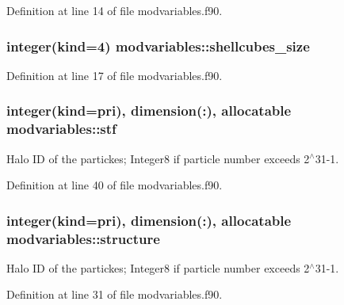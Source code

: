 Definition at line 14 of file modvariables.\+f90.

\subsubsection[{\texorpdfstring{shellcubes\+\_\+size}{shellcubes_size}}]{\setlength{\rightskip}{0pt plus 5cm}integer(kind=4) modvariables\+::shellcubes\+\_\+size}\hypertarget{namespacemodvariables_a9b7ba2cda6114449e99e9f7f348d4c32}{}\label{namespacemodvariables_a9b7ba2cda6114449e99e9f7f348d4c32}


Definition at line 17 of file modvariables.\+f90.

\subsubsection[{\texorpdfstring{stf}{stf}}]{\setlength{\rightskip}{0pt plus 5cm}integer(kind={\bf pri}), dimension(\+:), allocatable modvariables\+::stf}\hypertarget{namespacemodvariables_a5b99e0cc82073c06969e0fe6caa06357}{}\label{namespacemodvariables_a5b99e0cc82073c06969e0fe6caa06357}


Halo ID of the partickes; Integer8 if particle number exceeds 2$^\wedge$31-\/1. 



Definition at line 40 of file modvariables.\+f90.

\subsubsection[{\texorpdfstring{structure}{structure}}]{\setlength{\rightskip}{0pt plus 5cm}integer(kind={\bf pri}), dimension(\+:), allocatable modvariables\+::structure}\hypertarget{namespacemodvariables_a93c25eb46b5370bd8153733e03f3008d}{}\label{namespacemodvariables_a93c25eb46b5370bd8153733e03f3008d}


Halo ID of the partickes; Integer8 if particle number exceeds 2$^\wedge$31-\/1. 



Definition at line 31 of file modvariables.\+f90.


